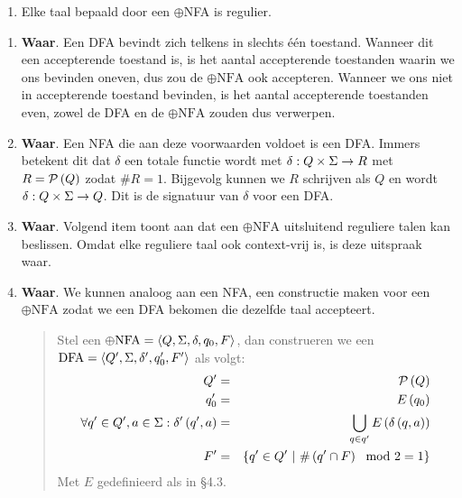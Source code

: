 \documentclass{article}
\begin{document}
\begin{question}[]
\begin{enumerate}
\item
Elke taal bepaald door een $\oplus$NFA is regulier.
\end{enumerate}
\begin{answer}
\begin{enumerate}
 \item \textbf{Waar}. Een DFA bevindt zich telkens in slechts \'e\'en toestand. Wanneer dit een accepterende toestand is, is het aantal accepterende toestanden waarin we ons bevinden oneven, dus zou de $\oplus\mbox{NFA}$ ook accepteren. Wanneer we ons niet in accepterende toestand bevinden, is het aantal accepterende toestanden even, zowel de DFA en de $\oplus\mbox{NFA}$ zouden dus verwerpen.
 \item \textbf{Waar}. Een NFA die aan deze voorwaarden voldoet is een DFA. Immers betekent dit dat $\delta$ een totale functie wordt met $\delta:Q\times\Sigma\rightarrow R$ met $R=\mathcal{P}\left( Q \right)$ zodat $\# R=1$. Bijgevolg kunnen we $R$ schrijven als $Q$ en wordt $\delta:Q\times\Sigma\rightarrow Q$. Dit is de signatuur van $\delta$ voor een DFA.
 \item \textbf{Waar}. Volgend item toont aan dat een $\oplus\mbox{NFA}$ uitsluitend reguliere talen kan beslissen. Omdat elke reguliere taal ook context-vrij is, is deze uitspraak waar.
 \item \textbf{Waar}. We kunnen analoog aan een NFA, een constructie maken voor een $\oplus\mbox{NFA}$ zodat we een DFA bekomen die dezelfde taal accepteert.
 \begin{quote}
 \begin{construction}
 Stel een $\oplus\mbox{NFA}=\left\langle Q,\Sigma,\delta,q_0,F \right\rangle$, dan construeren we een $\mbox{DFA}=\left\langle Q',\Sigma,\delta',q_0',F' \right\rangle$ als volgt:
 \begin{eqnarray}
  Q'&=&\mathcal{P}\left( Q \right)\\
  q_0'&=&E\left( q_0 \right)\\
  \forall q'\in Q',a\in\Sigma:\delta'\left( q',a \right)&=&\displaystyle\bigcup_{q\in q'}E\left( \delta\left( q,a \right) \right)\\
  F'&=&\left\{ q'\in Q'\ |\ \#\left( q'\cap F \right)\mod 2=1 \right\}
 \end{eqnarray}
 Met $E$ gedefinieerd als in \S4.3.
 \end{construction}
 \end{quote}

\end{enumerate}

\end{answer}
\end{question}
\end{document}
